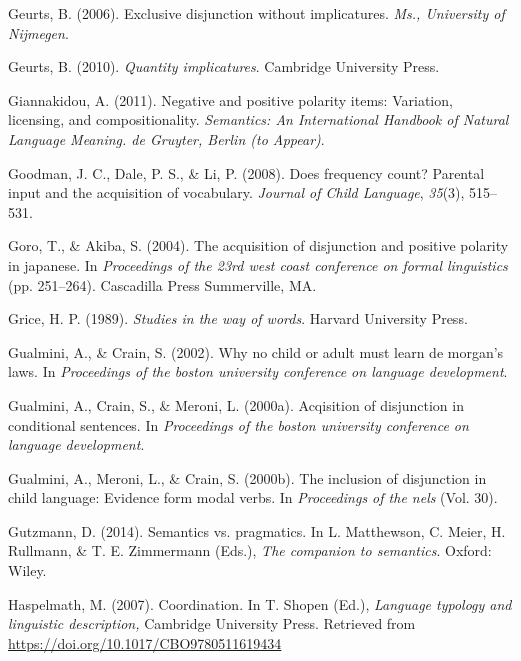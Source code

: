 \documentclass[oneside]{report}
\theoremstyle{definition}
\theoremstyle{definition}
\theoremstyle{definition}
\theoremstyle{remark}
\begin{document}
\hypertarget{ref-geurts2006exclusive}{}
Geurts, B. (2006). Exclusive disjunction without implicatures.
\emph{Ms., University of Nijmegen}.

\hypertarget{ref-geurts2010quantity}{}
Geurts, B. (2010). \emph{Quantity implicatures}. Cambridge University
Press.

\hypertarget{ref-giannakidou2011negative}{}
Giannakidou, A. (2011). Negative and positive polarity items: Variation,
licensing, and compositionality. \emph{Semantics: An International
Handbook of Natural Language Meaning. de Gruyter, Berlin (to Appear)}.

\hypertarget{ref-goodman2008does}{}
Goodman, J. C., Dale, P. S., \& Li, P. (2008). Does frequency count?
Parental input and the acquisition of vocabulary. \emph{Journal of Child
Language}, \emph{35}(3), 515--531.

\hypertarget{ref-goro2004acquisition}{}
Goro, T., \& Akiba, S. (2004). The acquisition of disjunction and
positive polarity in japanese. In \emph{Proceedings of the 23rd west
coast conference on formal linguistics} (pp. 251--264). Cascadilla Press
Summerville, MA.

\hypertarget{ref-grice1989studies}{}
Grice, H. P. (1989). \emph{Studies in the way of words}. Harvard
University Press.

\hypertarget{ref-gualminicrain2002}{}
Gualmini, A., \& Crain, S. (2002). Why no child or adult must learn de
morgan's laws. In \emph{Proceedings of the boston university conference
on language development}.

\hypertarget{ref-gualmini2000}{}
Gualmini, A., Crain, S., \& Meroni, L. (2000a). Acqisition of
disjunction in conditional sentences. In \emph{Proceedings of the boston
university conference on language development}.

\hypertarget{ref-gualmini2000inclusion}{}
Gualmini, A., Meroni, L., \& Crain, S. (2000b). The inclusion of
disjunction in child language: Evidence form modal verbs. In
\emph{Proceedings of the nels} (Vol. 30).

\hypertarget{ref-gutzmann2014}{}
Gutzmann, D. (2014). Semantics vs. pragmatics. In L. Matthewson, C.
Meier, H. Rullmann, \& T. E. Zimmermann (Eds.), \emph{The companion to
semantics}. Oxford: Wiley.

\hypertarget{ref-haspelmath2007}{}
Haspelmath, M. (2007). Coordination. In T. Shopen (Ed.), \emph{Language
typology and linguistic description,} Cambridge University Press.
Retrieved from \url{https://doi.org/10.1017/CBO9780511619434}
\end{document}
